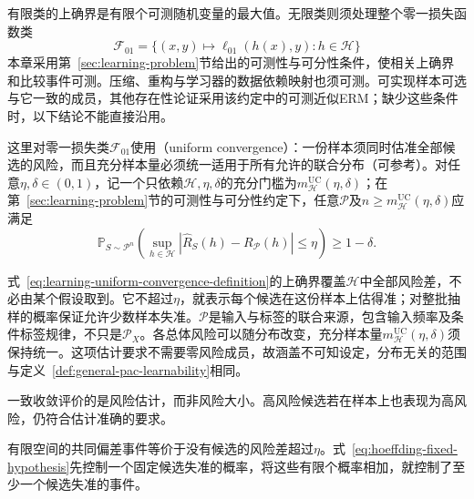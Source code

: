 有限类的上确界是有限个可测随机变量的最大值。无限类则须处理整个零一损失函数类
\[
 \mathcal F_{01}=\{(x,y)\mapsto\ell_{01}(h(x),y):h\in\mathcal H\}
\]
本章采用第~\ref{sec:learning-problem}节给出的可测性与可分性条件，使相关上确界和比较事件可测。压缩、重构与学习器的数据依赖映射也须可测。可实现样本可选与它一致的成员，其他存在性论证采用该约定中的可测近似ERM；缺少这些条件时，以下结论不能直接沿用。

\label{def:learning-uniform-convergence}
这里对零一损失类$\mathcal F_{01}$使用（uniform convergence）：一份样本须同时估准全部候选的风险，而且充分样本量必须统一适用于所有允许的联合分布（可参考）。对任意$\eta,\delta\in(0,1)$，记一个只依赖$\mathcal H,\eta,\delta$的充分门槛为$m_{\mathcal H}^{\mathrm{UC}}(\eta,\delta)$；在第~\ref{sec:learning-problem}节的可测性与可分性约定下，任意$\mathcal P$及$n\geq m_{\mathcal H}^{\mathrm{UC}}(\eta,\delta)$应满足
\begin{equation}
 \mathbb P_{S\sim\mathcal P^n}\left(
   \sup_{h\in\mathcal H}|\hat R_S(h)-R_{\mathcal P}(h)|\leq\eta
 \right)\geq1-\delta.
 \label{eq:learning-uniform-convergence-definition}
\end{equation}

式~\eqref{eq:learning-uniform-convergence-definition}的上确界覆盖$\mathcal H$中全部风险差，不必由某个假设取到。它不超过$\eta$，就表示每个候选在这份样本上估得准；对整批抽样的概率保证允许少数样本失准。$\mathcal P$是输入与标签的联合来源，包含输入频率及条件标签规律，不只是$\mathcal P_X$。各总体风险可以随分布改变，充分样本量$m_{\mathcal H}^{\mathrm{UC}}(\eta,\delta)$须保持统一。这项估计要求不需要零风险成员，故涵盖不可知设定，分布无关的范围与定义~\ref{def:general-pac-learnability}相同。

一致收敛评价的是风险估计，而非风险大小。高风险候选若在样本上也表现为高风险，仍符合估计准确的要求。

有限空间的共同偏差事件等价于没有候选的风险差超过$\eta$。式~\eqref{eq:hoeffding-fixed-hypothesis}先控制一个固定候选失准的概率，将这些有限个概率相加，就控制了至少一个候选失准的事件。

